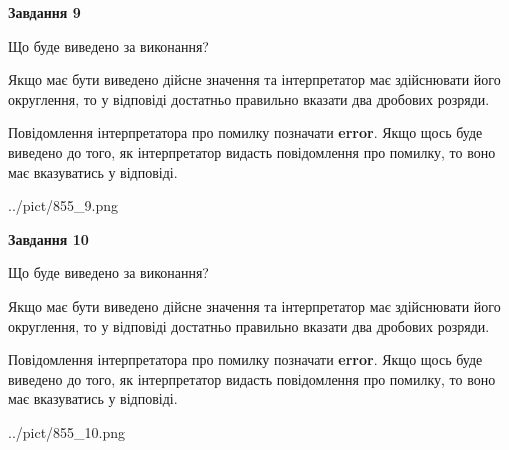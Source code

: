 \documentclass[12pt, ukrainian]{article}
\begin{document}
{\begin {Large}
{\begin {center}\textbf{Завдання 9}\end {center}}\par
Що буде виведено за виконання? \par

Якщо має бути виведено дійсне значення та інтерпретатор має здійснювати його округлення, 
то у відповіді достатньо правильно вказати два дробових розряди.

Повідомлення інтерпретатора про помилку позначати \textbf{error}.
Якщо щось буде виведено до того, як інтерпретатор видасть повідомлення про помилку, 
то воно має вказуватись у відповіді. \par

\begin{center}
	{../pict/855_9.png}
\end{center}
\newpage

{\begin {center}\textbf{Завдання 10}\end {center}}\par
Що буде виведено за виконання? \par

Якщо має бути виведено дійсне значення та інтерпретатор має здійснювати його округлення, 
то у відповіді достатньо правильно вказати два дробових розряди.

Повідомлення інтерпретатора про помилку позначати \textbf{error}.
Якщо щось буде виведено до того, як інтерпретатор видасть повідомлення про помилку, 
то воно має вказуватись у відповіді. \par

\begin{center}
	{../pict/855_10.png}
\end{center}
\newpage

\end {Large}}
\end{document}
